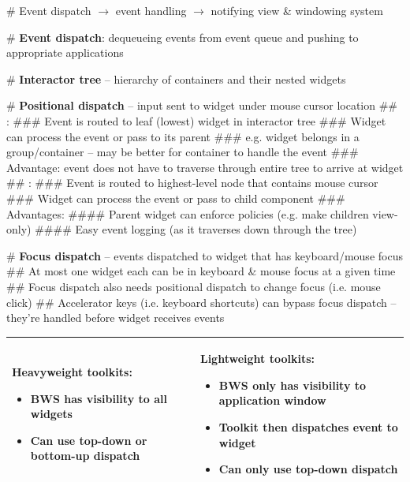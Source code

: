 \documentclass[11pt, oneside]{article}
\newcommand*{\un}[1]{\underline{\smash{#1}}}        %
\newenvironment{itemized}{\begin{itemize}[noitemsep, topsep=0pt, leftmargin=*]}{\end{itemize}}  %
\begin{document}
# Event dispatch $\rightarrow$ event handling $\rightarrow$ notifying view \& windowing system

# \textbf{Event dispatch}: dequeueing events from event queue and pushing to appropriate applications

# \textbf{Interactor tree} -- hierarchy of containers and their nested widgets

# \textbf{Positional dispatch} -- input sent to widget under mouse cursor location
## \un{Bottom-up dispatch}:
### Event is routed to leaf (lowest) widget in interactor tree
### Widget can process the event or pass to its parent
### e.g. widget belongs in a group/container -- may be better for container to handle the event
### Advantage: event does not have to traverse through entire tree to arrive at widget
## \un{Top-down dispatch}:
### Event is routed to highest-level node that contains mouse cursor
### Widget can process the event or pass to child component
### Advantages:
#### Parent widget can enforce policies (e.g. make children view-only)
#### Easy event logging (as it traverses down through the tree)

# \textbf{Focus dispatch} -- events dispatched to widget that has keyboard/mouse focus
## At most one widget each can be in keyboard \& mouse focus at a given time
## Focus dispatch also needs positional dispatch to change focus (i.e. mouse click)
## Accelerator keys (i.e. keyboard shortcuts) can bypass focus dispatch -- they're handled before widget receives events

\hspace{-2em}
\begin{tabular}{|l|l|}
\hline
\begin{minipage}[t]{0.45\textwidth}
\textbf{Heavyweight toolkits}:
    \begin{itemized}
    \item BWS has visibility to all widgets
    \item Can use top-down or bottom-up dispatch
    \end{itemized}
    \vspace*{0.5em}
\end{minipage}
&
\begin{minipage}[t]{0.45\textwidth}
\textbf{Lightweight toolkits}:
    \begin{itemized}
    \item BWS only has visibility to application window
    \item Toolkit then dispatches event to widget
    \item Can only use top-down dispatch
    \end{itemized}
    \vspace*{0.5em}
\end{minipage}  \\
\hline
\end{tabular} \\
\end{document}

